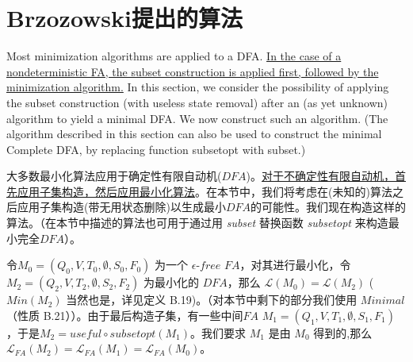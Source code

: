 \chapter{Brzozowski提出的算法}

Most minimization algorithms are applied to a DFA. \uline{In the case of a nondeterministic FA, the subset construction is applied first, followed by the minimization algorithm.} In this section, we consider the possibility of applying the subset construction (with useless state removal) after an (as yet unknown) algorithm to yield a minimal DFA. We now construct such an algorithm. (The algorithm described in this section can also be used to construct the minimal Complete DFA, by replacing function subsetopt with subset.)

大多数最小化算法应用于确定性有限自动机($DFA$)。\uline{对于不确定性有限自动机，首先应用子集构造，然后应用最小化算法}。在本节中，我们将考虑在(未知的)算法之后应用子集构造(带无用状态删除)以生成最小$DFA$的可能性。我们现在构造这样的算法。（在本节中描述的算法也可用于通过用 \textit{subset} 替换函数 \textit{subsetopt} 来构造最小完全$DFA$）。

令$M_0 = (Q_0,V,T_0,\emptyset ,S_0,F_0)$ 为一个 $\epsilon$-$free$ $FA$，对其进行最小化，令 $M_2 = ( Q_2,V,T_2,\emptyset,S_2,F_2 ) $ 为最小化的 $DFA$，那么 $ \mathcal{L} (M_0) = \mathcal{L}(M_2) $ ( $Min(M_2)$ 当然也是，详见定义 B.19)。（对本节中剩下的部分我们使用 $Minimal$（性质 B.21））。由于最后构造子集，有一些中间$FA$ $M_1 = ( Q_1,V,T_1,\emptyset,S_1,F_1 )$，于是$M_2 = useful \circ subsetopt(M_1)$。我们要求 $M_1$ 是由 $M_0$ 得到的,那么 $ \mathcal{L}_{FA}(M_2) = \mathcal{L}_{FA}(M_1) = \mathcal{L}_{FA}(M_0)$。

